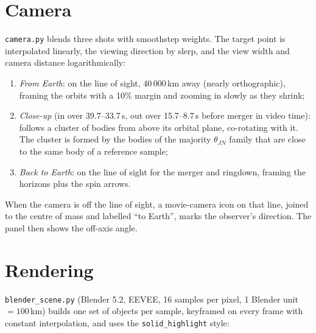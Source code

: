 \documentclass[11pt,a4paper]{article}
\newcommand{\code}[1]{\texttt{#1}}
\begin{document}
\section{Camera}\label{sec:camera}

\code{camera.py} blends three shots with smoothstep weights. The target point is
interpolated linearly, the viewing direction by slerp, and the view width and camera
distance logarithmically:
\begin{enumerate}
  \item \emph{From Earth}: on the line of sight, 40\,000\,km away (nearly orthographic),
        framing the orbits with a 10\% margin and zooming in slowly as they shrink;
  \item \emph{Close-up} (in over 39.7--33.7\,s, out over 15.7--8.7\,s before merger in
        video time): follows a cluster of bodies from above its orbital plane, co-rotating
        with it. The cluster is formed by the bodies of the majority $\theta_{JN}$ family
        that are close to the same body of a reference sample;
  \item \emph{Back to Earth}: on the line of sight for the merger and ringdown, framing the
        horizons plus the spin arrows.
\end{enumerate}
When the camera is off the line of sight, a movie-camera icon on that line, joined to the
centre of mass and labelled ``to Earth'', marks the observer's direction. The panel then
shows the off-axis angle.

\section{Rendering}\label{sec:render}

\code{blender\_scene.py} (Blender 5.2, EEVEE, 16 samples per pixel, 1 Blender unit
$=100$\,km) builds one set of objects per sample, keyframed on every frame with constant
interpolation, and uses the \code{solid\_highlight} style:
\end{document}
